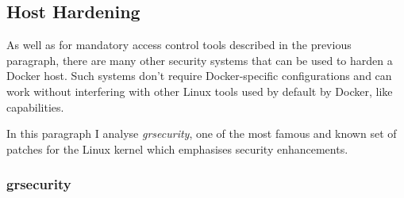 \documentclass[a4paper,12pt]{article}
\begin{document}
\subsection{Host Hardening}

As well as for mandatory access control tools described in the previous
paragraph, there are many other security systems that can be used to harden a
Docker host. Such systems don't require Docker-specific configurations and can
work without interfering with other Linux tools used by default by Docker, like
capabilities. \par In this paragraph I analyse \textit{grsecurity}, one of the
most famous and known set of  patches for the Linux kernel which emphasises
security enhancements.  

\subsubsection{grsecurity}
\end{document}

